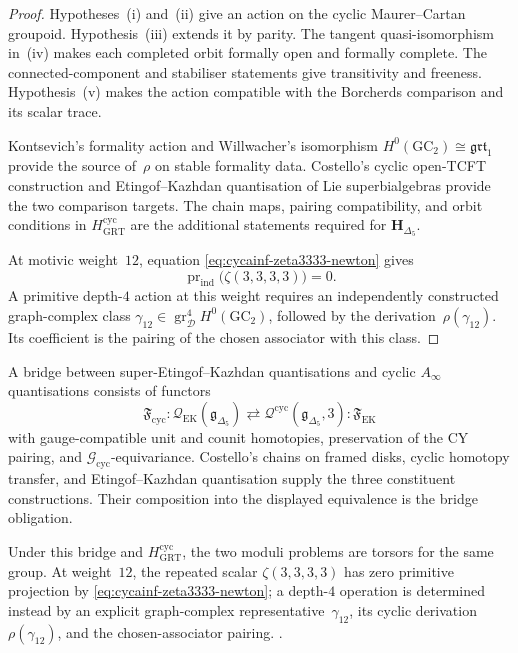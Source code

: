 \begin{proof}
Hypotheses~(i) and~(ii) give an action on the cyclic Maurer--Cartan
groupoid.  Hypothesis~(iii) extends it by parity.  The tangent
quasi-isomorphism in~(iv) makes each completed orbit formally open and
formally complete.  The connected-component and stabiliser statements
give transitivity and freeness.  Hypothesis~(v) makes the action
compatible with the Borcherds comparison and its scalar trace.

Kontsevich's formality action and Willwacher's isomorphism
$H^0(\mathrm{GC}_2)\cong\mathfrak{grt}_1$ provide the source of~$\rho$
on stable formality data.  Costello's cyclic open-TCFT construction and
Etingof--Kazhdan quantisation of Lie superbialgebras provide the two
comparison targets.  The chain maps, pairing compatibility, and orbit
conditions in $H_{\mathrm{GRT}}^{\mathrm{cyc}}$ are the additional
statements required for
$\mathbf H_{\Delta_5}$.

At motivic weight~$12$, equation
\eqref{eq:cycainf-zeta3333-newton} gives
\[
 \operatorname{pr}_{\mathrm{ind}}
 \bigl(\zeta(3,3,3,3)\bigr)=0.
\]
A primitive depth-$4$ action at this weight requires an independently
constructed graph-complex class
$\gamma_{12}\in
\operatorname{gr}_{\mathcal D}^4H^0(\mathrm{GC}_2)$, followed by the
derivation~$\rho(\gamma_{12})$.  Its coefficient is the pairing of the
chosen associator with this class.
\end{proof}

\begin{remark}
\label{rem:cycainf-grt1-bridge}
A bridge between super-Etingof--Kazhdan quantisations and cyclic
$A_\infty$ quantisations consists of functors
\[
 \mathfrak F_{\mathrm{cyc}}\colon
 \mathcal Q_{\mathrm{EK}}(\mathfrak g_{\Delta_5})
 \rightleftarrows
 \mathcal Q^{\mathrm{cyc}}(\mathfrak g_{\Delta_5},3)
 :\mathfrak F_{\mathrm{EK}}
\]
with gauge-compatible unit and counit homotopies, preservation of the
CY pairing, and
$\mathcal G_{\mathrm{cyc}}$-equivariance.  Costello's chains on framed
disks, cyclic homotopy transfer, and Etingof--Kazhdan quantisation
supply the three constituent constructions.  Their composition into
the displayed equivalence is the bridge obligation.

Under this bridge and $H_{\mathrm{GRT}}^{\mathrm{cyc}}$, the two
moduli problems are torsors for the same group.  At weight~$12$, the
repeated scalar $\zeta(3,3,3,3)$ has zero primitive projection by
\eqref{eq:cycainf-zeta3333-newton}; a depth-$4$ operation is determined
instead by an explicit graph-complex representative~$\gamma_{12}$,
its cyclic derivation~$\rho(\gamma_{12})$, and the chosen-associator
pairing.
\cite{Kontsevich2003,Costello2007Ainfty,DolgushevTamarkinTsygan2010,
 Willwacher2015,Brown2012}.
\end{remark}

